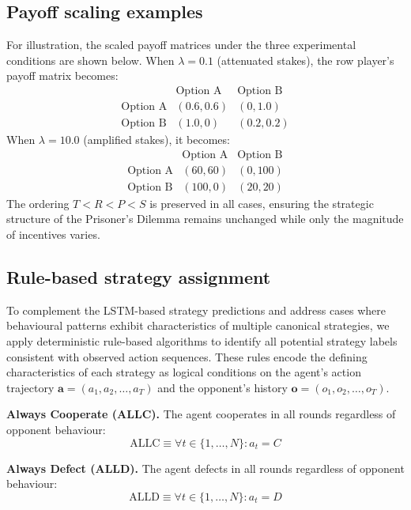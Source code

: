 \documentclass[a4paper,fleqn]{cas-sc}
\begin{document}
\subsection{Payoff scaling examples}\label{appendix:payoff_scaling}

For illustration, the scaled payoff matrices under the three experimental conditions are shown below. When $\lambda = 0.1$ (attenuated stakes), the row player's payoff matrix becomes:
\[
\begin{array}{c|cc}
 & \text{Option A} & \text{Option B} \\
\hline
\text{Option A} & (0.6, 0.6) & (0, 1.0) \\
\text{Option B} & (1.0, 0)   & (0.2, 0.2)
\end{array}
\]
When $\lambda = 10.0$ (amplified stakes), it becomes:
\[
\begin{array}{c|cc}
 & \text{Option A} & \text{Option B} \\
\hline
\text{Option A} & (60, 60) & (0, 100) \\
\text{Option B} & (100, 0) & (20, 20)
\end{array}
\]
The ordering $T < R < P < S$ is preserved in all cases, ensuring the strategic structure of the Prisoner's Dilemma remains unchanged while only the magnitude of incentives varies.

\subsection{Rule-based strategy assignment}\label{appendix:rule_based}

To complement the LSTM-based strategy predictions and address cases where behavioural patterns exhibit characteristics of multiple canonical strategies, we apply deterministic rule-based algorithms to identify all potential strategy labels consistent with observed action sequences. These rules encode the defining characteristics of each strategy as logical conditions on the agent's action trajectory $\mathbf{a} = (a_1, a_2, \ldots, a_T)$ and the opponent's history $\mathbf{o} = (o_1, o_2, \ldots, o_T)$.

\textbf{Always Cooperate (ALLC).} The agent cooperates in all rounds regardless of opponent behaviour:
\[
\text{ALLC} \equiv \forall t \in \{1, \ldots, N\}: a_t = C
\]

\textbf{Always Defect (ALLD).} The agent defects in all rounds regardless of opponent behaviour:
\[
\text{ALLD} \equiv \forall t \in \{1, \ldots, N\}: a_t = D
\]
\end{document}
